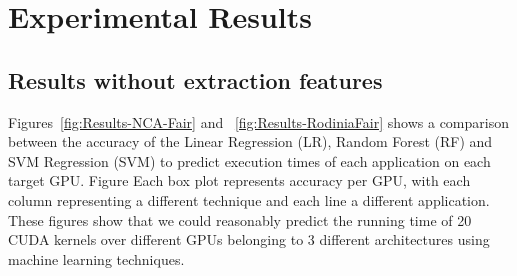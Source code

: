 
\section{Experimental Results}\label{sec:resultML}
\subsection{Results without extraction features}

Figures~\ref{fig:Results-NCA-Fair} and ~\ref{fig:Results-RodiniaFair} shows a comparison between the accuracy of the Linear Regression (LR), Random Forest (RF) and SVM Regression (SVM) to predict execution times of each application on each target GPU. Figure  Each box plot represents accuracy per GPU, with each column representing a different technique and each line a different application. These figures show that we could reasonably predict the running time of 20 CUDA kernels over different GPUs belonging to 3 different architectures using machine learning techniques. 




